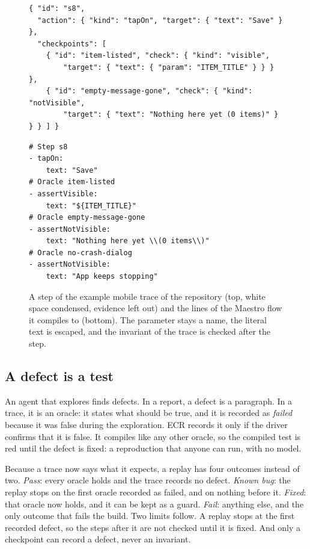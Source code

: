 \begin{figure}[t]
\begin{lstlisting}
{ "id": "s8",
  "action": { "kind": "tapOn", "target": { "text": "Save" } },
  "checkpoints": [
    { "id": "item-listed", "check": { "kind": "visible",
        "target": { "text": { "param": "ITEM_TITLE" } } } },
    { "id": "empty-message-gone", "check": { "kind": "notVisible",
        "target": { "text": "Nothing here yet (0 items)" } } } ] }
\end{lstlisting}
\begin{lstlisting}
# Step s8
- tapOn:
    text: "Save"
# Oracle item-listed
- assertVisible:
    text: "${ITEM_TITLE}"
# Oracle empty-message-gone
- assertNotVisible:
    text: "Nothing here yet \\(0 items\\)"
# Oracle no-crash-dialog
- assertNotVisible:
    text: "App keeps stopping"
\end{lstlisting}
\caption{A step of the example mobile trace of the repository (top, white space condensed, evidence left out) and the lines of the Maestro flow it compiles to (bottom). The parameter stays a name, the literal text is escaped, and the invariant of the trace is checked after the step.}
\label{fig:step}
\end{figure}

\subsection{A defect is a test}
\label{sec:bug}

An agent that explores finds defects. In a report, a defect is a paragraph. In a trace, it is an oracle: it states what should be true, and it is recorded as \emph{failed} because it was false during the exploration. ECR records it only if the driver confirms that it is false. It compiles like any other oracle, so the compiled test is red until the defect is fixed: a reproduction that anyone can run, with no model.

Because a trace now says what it expects, a replay has four outcomes instead of two. \emph{Pass}: every oracle holds and the trace records no defect. \emph{Known bug}: the replay stops on the first oracle recorded as failed, and on nothing before it. \emph{Fixed}: that oracle now holds, and it can be kept as a guard. \emph{Fail}: anything else, and the only outcome that fails the build. Two limits follow. A replay stops at the first recorded defect, so the steps after it are not checked until it is fixed. And only a checkpoint can record a defect, never an invariant.

